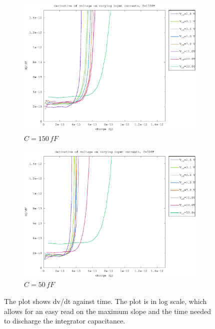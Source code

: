\documentclass{article}
\begin{document}
\begin{figure}[h]
\begin{subfigure}[b]{0.475\textwidth}
	    \centering 
	    \includegraphics[width=\textwidth]{fig/d_slope_150fF.eps}
	    \caption[]%
	    {$C=150\,fF$}    
	    \label{fig:d_slopes_150fF}
	\end{subfigure}
	\quad
	\begin{subfigure}[b]{0.475\textwidth}   
	    \centering 
	    \includegraphics[width=\textwidth]{fig/d_slope_50fF.eps}
	    \caption[]%
	    {$C=50\,fF$}    
	    \label{fig:d_slopes_50fF}
	\end{subfigure}
	\caption{The plot shows dv/dt against time. The plot is in log scale, which allows for an easy read on the maximum slope and the time needed to discharge the integrator capacitance. }
	\label{fig:d_slopes}
\end{figure}
\end{document}
